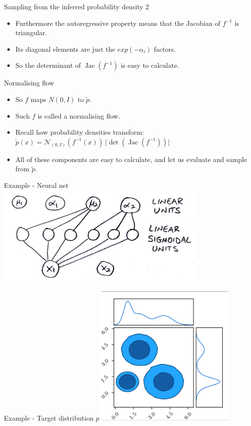 \documentclass[usenames,dvipsnames]{beamer}
\DeclareMathOperator{\jac}{Jac}
\begin{document}
\begin{frame}{Sampling from the inferred probability density 2}
    \begin{itemize}
      \item{Furthermore the autoregressive property means that the Jacobian of $f^{-1}$ is triangular.}
	\item{Its diagonal elements are just the $exp(-\alpha_i)$ factors.}
	\item{So the determinant of $\jac(f^{-1})$ is easy to calculate.}
    \end{itemize}
\end{frame}

\begin{frame}{Normalising flow}
    \begin{itemize}
      \item{So $f$ maps $N(0, I)$ to $\tilde{p}$.}
	\item{Such $f$ is called a normalising flow.}
	\item{Recall how probability densities transform: \\
	$\tilde{p}(x) = \mathcal{N}_{(0, I)}(f^{-1}(x)) \ \lvert \det(\jac(f^{-1})) \rvert$}
	\item{All of these components are easy to calculate, and let us evaluate and sample from $\tilde{p}$.}
    \end{itemize}
\end{frame}

\begin{frame}{Example - Neural net}
     \centering
     \includegraphics[height=5cm]{image_06}
\end{frame}

\begin{frame}{Example - Target distribution $p$}
     \centering
     \includegraphics[height=7cm]{image_07}
\end{frame}
\end{document}
